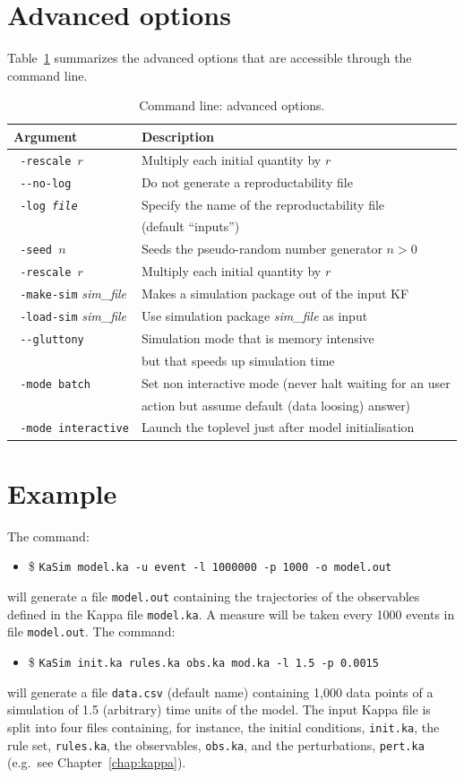 \documentclass[11pt]{book}
\def\ttt#1{\texttt{#1}}
\def\eg{e.g.~}
\def\ITE#1{\begin{itemize}#1\end{itemize}}
\def\dd{-\hspace{0.001cm}-}
\begin{document}
\section{Advanced options}

Table~\ref{tab:add-options} summarizes the advanced options that are accessible through the command line.

\begin{table}[h!]
\caption{Command line: advanced options.}
\centering
\begin{tabular}{|l|l|}
\hline
Argument & Description \\ \hline
\ttt{ -rescale $r$} & Multiply each initial quantity by $r$ \\
\ttt{ \dd no-log} & Do not generate a reproductability file \\
\ttt{ -log \textit{file}} & Specify the name of the reproductability file \\
& (default ``inputs'') \\
\ttt{ -seed $n$} & Seeds the pseudo-random number generator $n>0$ \\
\ttt{ -rescale $r$} & Multiply each initial quantity by $r$ \\
\ttt{ -make-sim} \textit{sim\_file} & Makes a simulation package out of the input KF\index{Kappa file} \\
\ttt{ -load-sim} \textit{sim\_file} & Use simulation package \textit{sim\_file} as input\\
\ttt{ \dd gluttony} & Simulation mode that is memory intensive \\ & but that speeds up simulation time\\
\ttt{ -mode batch} & Set non interactive mode (never halt waiting for an user\\
& action but assume default (data loosing) answer)\\
\ttt{ -mode interactive} & Launch the toplevel just after model initialisation\\
\hline
\end{tabular}
\label{tab:add-options}
\end{table}%
%

\section{Example}
The command:
\ITE{
\item[\$] \ttt{KaSim model.ka -u event -l 1000000 -p 1000 -o model.out}
}
will generate a file \ttt{model.out} containing the trajectories of the observables defined in the Kappa file \ttt{model.ka}. A measure will be taken every 1000 events in file \ttt{model.out}. The command:
\ITE{
\item[\$] \ttt{KaSim init.ka rules.ka obs.ka mod.ka -l 1.5 -p 0.0015}
}
will generate a file \ttt{data.csv} (default name) containing 1,000 data points of a simulation of 1.5 (arbitrary) time units of the model. The input Kappa file is split into four files containing, for instance, the initial conditions, \ttt{init.ka}, the rule set, \ttt{rules.ka}, the observables, \ttt{obs.ka}, and the perturbations, \ttt{pert.ka} ({\eg}see Chapter~\ref{chap:kappa}). %
\end{document}
